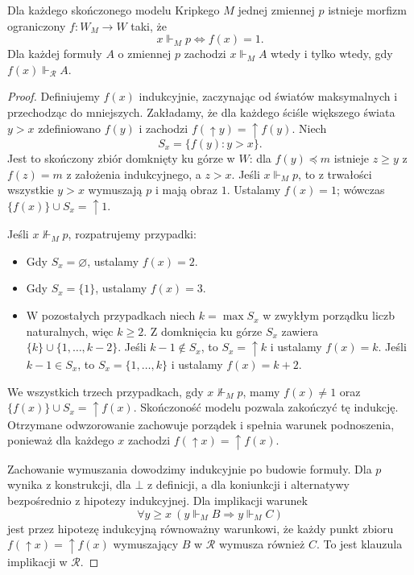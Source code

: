 \begin{lemat}
\label{lem:ncl-heyting-rn-universal}
Dla każdego skończonego modelu Kripkego $M$
jednej zmiennej $p$ istnieje morfizm ograniczony
$f:W_M\to W$ taki, że
\[
 x\Vdash_M p\iff f(x)=1.
\]
Dla każdej formuły $A$ o zmiennej $p$ zachodzi
$x\Vdash_M A$ wtedy i tylko wtedy,
gdy $f(x)\Vdash_{\mathcal R} A$.
\end{lemat}
\begin{proof}
Definiujemy $f(x)$ indukcyjnie, zaczynając od
światów maksymalnych i przechodząc do mniejszych.
Zakładamy, że dla każdego ściśle większego
świata $y>x$ zdefiniowano $f(y)$ i zachodzi
$f(\uparrow y)=\uparrow f(y)$.
Niech
\[
 S_x=\{f(y):y>x\}.
\]
Jest to skończony zbiór domknięty ku górze
w $W$: dla $f(y)\preceq m$ istnieje
$z\geq y$ z $f(z)=m$ z założenia indukcyjnego,
a $z>x$. Jeśli $x\Vdash_M p$, to z trwałości
wszystkie $y>x$ wymuszają $p$ i mają obraz $1$.
Ustalamy $f(x)=1$; wówczas
$\{f(x)\}\cup S_x=\uparrow1$.

Jeśli $x\not\Vdash_M p$, rozpatrujemy przypadki:
\begin{itemize}
\item Gdy $S_x=\varnothing$, ustalamy $f(x)=2$.
\item Gdy $S_x=\{1\}$, ustalamy $f(x)=3$.
\item W pozostałych przypadkach niech $k=\max S_x$
      w zwykłym porządku liczb naturalnych,
      więc $k\geq2$. Z domknięcia ku górze
      $S_x$ zawiera $\{k\}\cup\{1,\ldots,k-2\}$.
      Jeśli $k-1\notin S_x$, to
      $S_x=\uparrow k$ i ustalamy $f(x)=k$.
      Jeśli $k-1\in S_x$, to
      $S_x=\{1,\ldots,k\}$ i ustalamy $f(x)=k+2$.
\end{itemize}
We wszystkich trzech przypadkach, gdy
$x\not\Vdash_M p$, mamy $f(x)\ne1$ oraz
$\{f(x)\}\cup S_x=\uparrow f(x)$.
Skończoność modelu pozwala zakończyć tę indukcję.
Otrzymane odwzorowanie zachowuje porządek
i spełnia warunek podnoszenia, ponieważ dla
każdego $x$ zachodzi
$f(\uparrow x)=\uparrow f(x)$.

Zachowanie wymuszania dowodzimy indukcyjnie
po budowie formuły. Dla $p$ wynika z konstrukcji,
dla $\bot$ z definicji, a dla koniunkcji
i alternatywy bezpośrednio z hipotezy indukcyjnej.
Dla implikacji warunek
\[
 \forall y\geq x\
 (y\Vdash_M B\Longrightarrow y\Vdash_M C)
\]
jest przez hipotezę indukcyjną równoważny
warunkowi, że każdy punkt zbioru
$f(\uparrow x)=\uparrow f(x)$ wymuszający
$B$ w $\mathcal R$ wymusza również $C$.
To jest klauzula implikacji w $\mathcal R$.
\end{proof}

